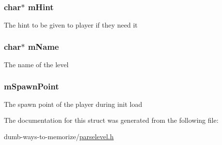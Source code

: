\subsubsection[{\texorpdfstring{m\+Hint}{mHint}}]{\setlength{\rightskip}{0pt plus 5cm}char$\ast$ m\+Hint}\hypertarget{structlevel__s_a3353a10b7f238b4dc36fc1ccad58cd45}{}\label{structlevel__s_a3353a10b7f238b4dc36fc1ccad58cd45}
The hint to be given to player if they need it 
\subsubsection[{\texorpdfstring{m\+Name}{mName}}]{\setlength{\rightskip}{0pt plus 5cm}char$\ast$ m\+Name}\hypertarget{structlevel__s_ad5201d7f075979ee60c684961d6a4ead}{}\label{structlevel__s_ad5201d7f075979ee60c684961d6a4ead}
The name of the level 
\subsubsection[{\texorpdfstring{m\+Spawn\+Point}{mSpawnPoint}}]{ m\+Spawn\+Point}\hypertarget{structlevel__s_aa7fb9f569bb3df8b37853ebc7e67b11c}{}\label{structlevel__s_aa7fb9f569bb3df8b37853ebc7e67b11c}
The spawn point of the player during init load 

The documentation for this struct was generated from the following file\+:\begin{DoxyCompactItemize}
\item 
dumb-\/ways-\/to-\/memorize/\hyperlink{parselevel_8h}{parselevel.\+h}\end{DoxyCompactItemize}
